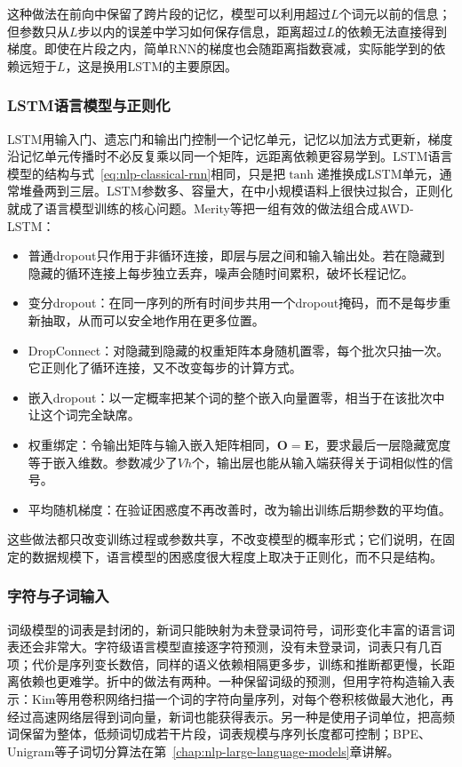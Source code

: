 这种做法在前向中保留了跨片段的记忆，模型可以利用超过$L$个词元以前的信息；但参数只从$L$步以内的误差中学习如何保存信息，距离超过$L$的依赖无法直接得到梯度。即使在片段之内，简单RNN的梯度也会随距离指数衰减，实际能学到的依赖远短于$L$，这是换用LSTM的主要原因。

\subsubsection{LSTM语言模型与正则化}
\label{sec:nlp-classical-lstm-regularization}

LSTM用输入门、遗忘门和输出门控制一个记忆单元，记忆以加法方式更新，梯度沿记忆单元传播时不必反复乘以同一个矩阵，远距离依赖更容易学到。LSTM语言模型的结构与式~\eqref{eq:nlp-classical-rnn}相同，只是把$\tanh$递推换成LSTM单元，通常堆叠两到三层。LSTM参数多、容量大，在中小规模语料上很快过拟合，正则化就成了语言模型训练的核心问题。Merity等把一组有效的做法组合成AWD-LSTM：
\begin{itemize}
  \item 普通dropout只作用于非循环连接，即层与层之间和输入输出处。若在隐藏到隐藏的循环连接上每步独立丢弃，噪声会随时间累积，破坏长程记忆。
  \item 变分dropout：在同一序列的所有时间步共用一个dropout掩码，而不是每步重新抽取，从而可以安全地作用在更多位置。
  \item DropConnect：对隐藏到隐藏的权重矩阵本身随机置零，每个批次只抽一次。它正则化了循环连接，又不改变每步的计算方式。
  \item 嵌入dropout：以一定概率把某个词的整个嵌入向量置零，相当于在该批次中让这个词完全缺席。
  \item 权重绑定：令输出矩阵与输入嵌入矩阵相同，$\bm O=\bm E$，要求最后一层隐藏宽度等于嵌入维数。参数减少了$Vh$个，输出层也能从输入端获得关于词相似性的信号。
  \item 平均随机梯度：在验证困惑度不再改善时，改为输出训练后期参数的平均值。
\end{itemize}
这些做法都只改变训练过程或参数共享，不改变模型的概率形式；它们说明，在固定的数据规模下，语言模型的困惑度很大程度上取决于正则化，而不只是结构。

\subsubsection{字符与子词输入}
\label{sec:nlp-classical-char-subword}

词级模型的词表是封闭的，新词只能映射为未登录词符号，词形变化丰富的语言词表还会非常大。字符级语言模型直接逐字符预测，没有未登录词，词表只有几百项；代价是序列变长数倍，同样的语义依赖相隔更多步，训练和推断都更慢，长距离依赖也更难学。折中的做法有两种。一种保留词级的预测，但用字符构造输入表示：Kim等用卷积网络扫描一个词的字符向量序列，对每个卷积核做最大池化，再经过高速网络层得到词向量，新词也能获得表示。另一种是使用子词单位，把高频词保留为整体，低频词切成若干片段，词表规模与序列长度都可控制；BPE、Unigram等子词切分算法在第~\ref{chap:nlp-large-language-models}章讲解。

